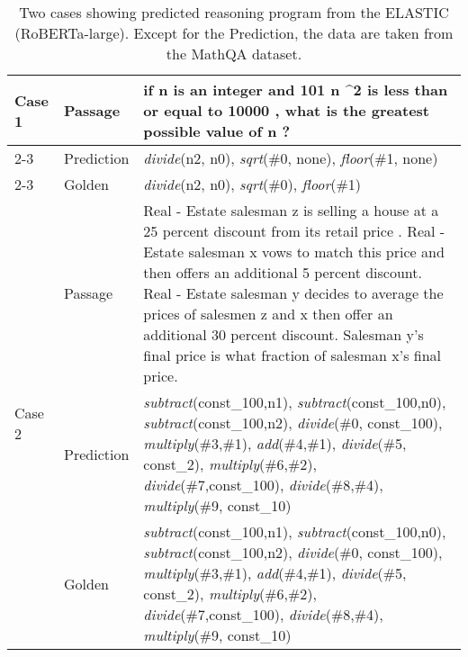 \documentclass{article}
\begin{document}
\begin{table}[tbhp!]
\caption{Two cases showing predicted reasoning program from the ELASTIC (RoBERTa-large). Except for the Prediction, the data are taken from the MathQA dataset.}
\label{tab:case-study}
\centering
\begin{small}
\begin{tabular}{@{}llp{10.8cm}}
\toprule
\multirow{4}{*}{Case 1} & Passage    & if n is an integer and 101 n \textasciicircum 2 is less than or equal to 10000 , what is the greatest possible value of n ? \\ \cmidrule(l){2-3} 
                        & Prediction & \textit{divide}(n2, n0), \textit{sqrt}(\#0, none), \textit{floor}(\#1, none)                                                                                       \\ \cmidrule(l){2-3} 
                        & Golden     & \textit{divide}(n2, n0), \textit{sqrt}(\#0), \textit{floor}(\#1)                                                                                         \\ \midrule
\multirow{7}{*}{Case 2} &
  Passage &
  Real - Estate salesman z is selling a house at a 25 percent discount from its retail price . Real - Estate  salesman x vows to match this price and  then offers an additional 5 percent discount. Real - Estate salesman y decides to average the prices of salesmen z and x  then offer an additional 30 percent discount. Salesman y's final price is what fraction of salesman x's final price. \\ \cmidrule(l){2-3} 
                        & Prediction & \textit{subtract}(const\_100,n1), \textit{subtract}(const\_100,n0), \textit{subtract}(const\_100,n2), \textit{divide}(\#0, const\_100), \textit{multiply}(\#3,\#1), \textit{add}(\#4,\#1), \textit{divide}(\#5, const\_2), \textit{multiply}(\#6,\#2), \textit{divide}(\#7,const\_100), \textit{divide}(\#8,\#4), \textit{multiply}(\#9, const\_10)                                                                                                                        \\ \cmidrule(l){2-3} 
                        & Golden     & \textit{subtract}(const\_100,n1), \textit{subtract}(const\_100,n0), \textit{subtract}(const\_100,n2), \textit{divide}(\#0, const\_100), \textit{multiply}(\#3,\#1), \textit{add}(\#4,\#1), \textit{divide}(\#5, const\_2), \textit{multiply}(\#6,\#2), \textit{divide}(\#7,const\_100), \textit{divide}(\#8,\#4), \textit{multiply}(\#9, const\_10)                                                                                                                        \\ \bottomrule
\end{tabular}
\end{small}
\end{table}
\end{document}
